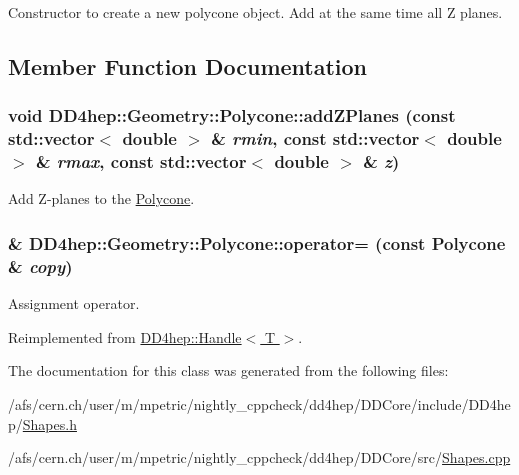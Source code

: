 Constructor to create a new polycone object. Add at the same time all Z planes. 

\subsection{Member Function Documentation}
\hypertarget{class_d_d4hep_1_1_geometry_1_1_polycone_abd0c99bd0c46a720fd11096b5b4a1eb1}{
\subsubsection[{addZPlanes}]{\setlength{\rightskip}{0pt plus 5cm}void DD4hep::Geometry::Polycone::addZPlanes (const std::vector$<$ double $>$ \& {\em rmin}, \/  const std::vector$<$ double $>$ \& {\em rmax}, \/  const std::vector$<$ double $>$ \& {\em z})}}
\label{class_d_d4hep_1_1_geometry_1_1_polycone_abd0c99bd0c46a720fd11096b5b4a1eb1}


Add Z-\/planes to the \hyperlink{class_d_d4hep_1_1_geometry_1_1_polycone}{Polycone}. \hypertarget{class_d_d4hep_1_1_geometry_1_1_polycone_af835c690e14207f479b096d84167bad2}{
\subsubsection[{operator=}]{\& DD4hep::Geometry::Polycone::operator= (const {\bf Polycone} \& {\em copy})}}
\label{class_d_d4hep_1_1_geometry_1_1_polycone_af835c690e14207f479b096d84167bad2}


Assignment operator. 

Reimplemented from \hyperlink{class_d_d4hep_1_1_handle_a9bbf8f498df42e81ad26fb00233505a6}{DD4hep::Handle$<$ T $>$}.

The documentation for this class was generated from the following files:\begin{DoxyCompactItemize}
\item 
/afs/cern.ch/user/m/mpetric/nightly\_\-cppcheck/dd4hep/DDCore/include/DD4hep/\hyperlink{_shapes_8h}{Shapes.h}\item 
/afs/cern.ch/user/m/mpetric/nightly\_\-cppcheck/dd4hep/DDCore/src/\hyperlink{_shapes_8cpp}{Shapes.cpp}\end{DoxyCompactItemize}
